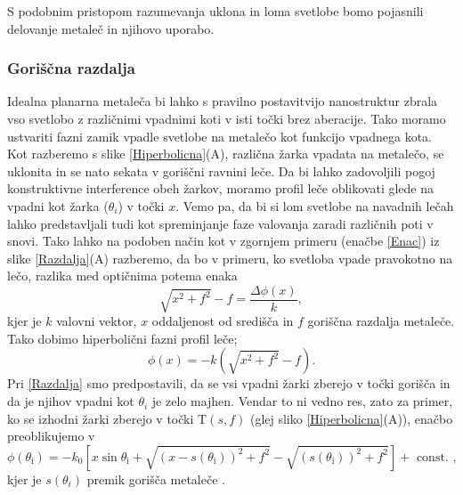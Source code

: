 \documentclass[12pt ]{article}
\begin{document}
S podobnim pristopom razumevanja uklona in loma svetlobe bomo pojasnili delovanje metaleč in njihovo uporabo.

\subsubsection{Goriščna razdalja}

Idealna planarna metaleča bi lahko s pravilno postavitvijo nanostruktur zbrala vso svetlobo z različnimi vpadnimi koti v isti točki brez aberacije. Tako moramo ustvariti fazni zamik vpadle svetlobe na metalečo kot funkcijo vpadnega kota. \\
Kot razberemo s slike \ref{Hiperbolicna}(A), različna žarka vpadata na metalečo, se uklonita in se nato sekata v goriščni ravnini leče. Da bi lahko zadovoljili pogoj konstruktivne interference obeh žarkov, moramo profil leče oblikovati glede na vpadni kot žarka ($\theta_i$) v točki $x$. 
Vemo pa, da bi si lom svetlobe na navadnih lečah lahko predstavljali tudi kot spreminjanje faze valovanja zaradi različnih poti v snovi. Tako lahko na podoben način kot v zgornjem primeru (enačbe \eqref{Enac}) iz slike \ref{Razdalja}(A) razberemo, da bo v primeru, ko svetloba vpade pravokotno na lečo, razlika med optičnima potema enaka
\begin{equation}
    \sqrt{x^2+f^2}-f=\frac{\Delta \phi(x)}{k},
\end{equation}
kjer je $k$ valovni vektor, $x$ oddaljenost od središča in $f$ goriščna razdalja metaleče. Tako dobimo hiperbolični fazni profil leče; 
\begin{equation}
    \phi(x)= -k\left(\sqrt{x^2+f^2}-f\right).
    \label{Razdalja}
\end{equation}
Pri \eqref{Razdalja} smo predpostavili, da se vsi vpadni žarki zberejo v točki gorišča in da je njihov vpadni kot $\theta_i$ je zelo majhen. Vendar to ni vedno res, zato za primer, ko se izhodni žarki zberejo v točki T$(s,f)$ (glej sliko \ref{Hiperbolicna}(A)), enačbo  preoblikujemo v 
\begin{equation}
    \phi\left( \theta_{\mathrm{i}}\right)=-k_{0}\left[x \sin \theta_{\mathrm{i}}+\sqrt{\left(x-s\left(\theta_{\mathrm{i}}\right)\right)^{2}+f^{2}}-\sqrt{\left(s\left(\theta_{\mathrm{i}}\right)\right)^{2}+f^{2}}\right]+\text { const. },
\end{equation}
kjer je $s(\theta_i)$ premik gorišča metaleče \cite{Goriscna}.
\end{document}
